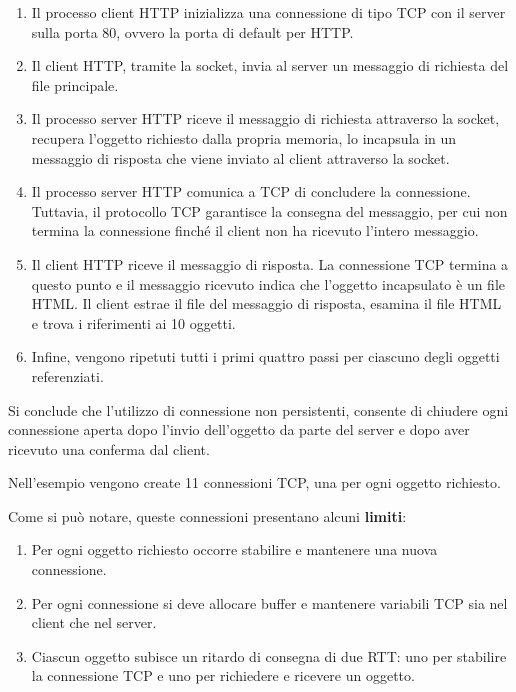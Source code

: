 \documentclass[a4paper]{article}
\begin{document}
	\begin{enumerate}
		\item Il processo client HTTP inizializza una connessione di tipo TCP con il server sulla porta 80, ovvero la porta di default per HTTP.
		
		\item Il client HTTP, tramite la socket, invia al server un messaggio di richiesta del file principale.
		
		\item Il processo server HTTP riceve il messaggio di richiesta attraverso la socket, recupera l’oggetto richiesto dalla propria memoria, lo incapsula in un messaggio di risposta che viene inviato al client attraverso la socket.
		
		\item Il processo server HTTP comunica a TCP di concludere la connessione. Tuttavia, il protocollo TCP garantisce la consegna del messaggio, per cui non termina la connessione finché il client non ha ricevuto l’intero messaggio.
		
		\item Il client HTTP riceve il messaggio di risposta. La connessione TCP termina a questo punto e il messaggio ricevuto indica che l’oggetto incapsulato è un file HTML. Il client estrae il file del messaggio di risposta, esamina il file HTML e trova i riferimenti ai 10 oggetti.
		
		\item Infine, vengono ripetuti tutti i primi quattro passi per ciascuno degli oggetti referenziati.
	\end{enumerate}

	\noindent
	Si conclude che l’utilizzo di connessione non persistenti, consente di chiudere ogni connessione aperta dopo l’invio dell’oggetto da parte del server e dopo aver ricevuto una conferma dal client.\newline
	
	\noindent
	Nell’esempio vengono create 11 connessioni TCP, una per ogni oggetto richiesto.\newline
	
	\noindent
	Come si può notare, queste connessioni presentano alcuni \textbf{limiti}:
	
	\begin{enumerate}
		\item Per ogni oggetto richiesto occorre stabilire e mantenere una nuova connessione.
		
		\item Per ogni connessione si deve allocare buffer e mantenere variabili TCP sia nel client che nel server.
		
		\item Ciascun oggetto subisce un ritardo di consegna di due RTT: uno per stabilire la connessione TCP e uno per richiedere e ricevere un oggetto.
	\end{enumerate}
\end{document}
